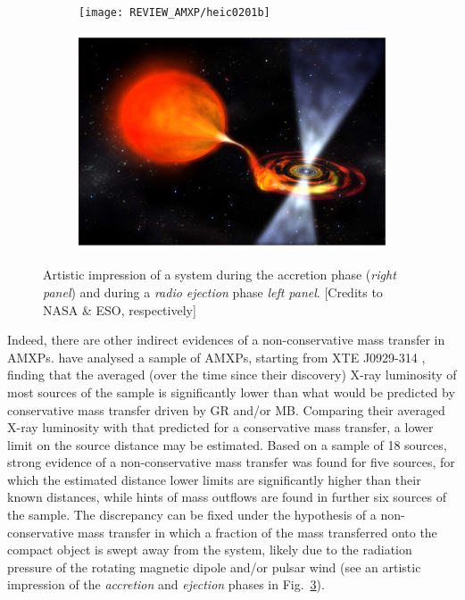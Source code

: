 \documentclass[graybox]{svmult}
\begin{document}
\begin{figure}
\begin{subfigure}{.5\textwidth}
  \centering
  \texttt{[image: REVIEW\_AMXP/heic0201b]}
  \label{fig:sfig1}
\end{subfigure}%
\begin{subfigure}{.5\textwidth}
  \centering
  \includegraphics[width=1.04\linewidth]{REVIEW_AMXP/making_a_Nova}
  \label{fig:sfig2}
\end{subfigure}
\caption{Artistic impression of a system during the accretion phase (\textit{right panel}) and during a \textit{radio ejection}
phase \textit{left panel}. [Credits to NASA \& ESO, respectively]}
\label{fig:con_mt}
\end{figure}



Indeed, there are other indirect evidences of a non-conservative mass transfer in AMXPs. \cite{Marino2019} have analysed a sample of AMXPs, starting from XTE J0929-314 \cite{Marino2017}, finding that the averaged (over the time since their discovery) X-ray luminosity of most sources of the sample is significantly lower than what would be predicted by conservative mass transfer driven by GR and/or MB. Comparing their averaged X-ray luminosity with that predicted for a conservative mass transfer, a lower limit on the source distance may be estimated. Based on a sample of 18 sources, strong evidence of a non-conservative mass transfer was found for five sources, for which the estimated distance lower limits are significantly higher than their known distances, while hints of mass outflows are found in further six sources of the sample. The discrepancy can be fixed under the hypothesis of a non-conservative mass transfer in which a fraction of the mass transferred onto the compact object is swept away from the system, likely due to the radiation pressure of the rotating magnetic dipole and/or pulsar wind (see an artistic impression of the \textit{accretion} and \textit{ejection} phases in Fig.~\ref{fig:con_mt}).
\end{document}
